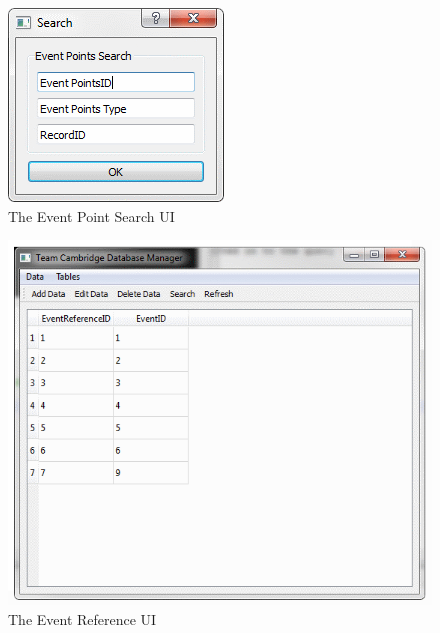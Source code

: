 \begin{figure}
\includegraphics[width=\textwidth]{./Maintenance/UI/EventPointsSearch.png}
\caption{The Event Point Search UI} \label{fig:EventPointsSearch_UI}
\end{figure}

\clearpage

\begin{figure}
\includegraphics[width=\textwidth]{./Maintenance/UI/EventRef.png}
\caption{The Event Reference UI} \label{fig:EventRef_UI}
\end{figure}


